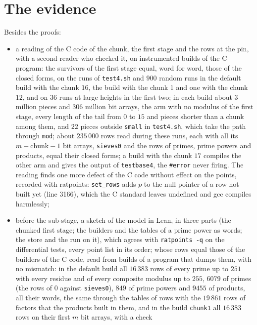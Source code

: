 \section{The evidence}\label{sec:rows-evidence}

Besides the proofs:
\begin{itemize}
  \item a reading of the C code of the chunk, the first stage and the rows at the pin, with a second
    reader who checked it, on instrumented builds of the C program: the survivors of the first stage
    equal, word for word, those of the closed forms, on the runs of \verb|test4.sh| and $900$ random
    runs in the default build with the chunk $16$, the build with the chunk $1$ and one with the
    chunk $12$, and on $36$ runs at large heights in the first two; in each build about $3$ million
    pieces and $306$ million bit arrays, the arm with no modulus of the first stage, every length of
    the tail from $0$ to $15$ and pieces shorter than a chunk among them, and $22$ pieces outside
    \verb|small| in \verb|test4.sh|, which take the path through \verb|mod|; about $235\,000$ rows
    read during these runs, each with all its $m + \mathrm{chunk} - 1$ bit arrays, \verb|sieves0|
    and the rows of primes, prime powers and products, equal their closed forms; a build with the
    chunk $17$ compiles the other arm and gives the output of \verb|testbase4|, the \verb|#error|
    never firing. The reading finds one more defect of the C code without effect on the points,
    recorded with ratpoints: \verb|set_rows| adds $p$ to the null pointer of a row not built yet
    (line 3166), which the C standard leaves undefined and gcc compiles harmlessly;
  \item before the sub-stage, a sketch of the model in Lean, in three parts (the chunked first
    stage; the builders and the tables of a prime power as words; the store and the run on it),
    which agrees with \verb|ratpoints -q| on the differential tests, every point list in its order;
    whose rows equal those of the builders of the C code, read from builds of a program that dumps
    them, with no mismatch: in the default build all $16\,383$ rows of every prime up to $251$ with
    every residue and of every composite modulus up to $255$, $6079$ of primes (the rows of $0$
    against \verb|sieves0|), $849$ of prime powers and $9455$ of products, all their words, the same
    through the tables of rows with the $19\,861$ rows of factors that the products built in them,
    and in the build \verb|chunk1| all $16\,383$ rows on their first $m$ bit arrays, with a check

\end{itemize}
